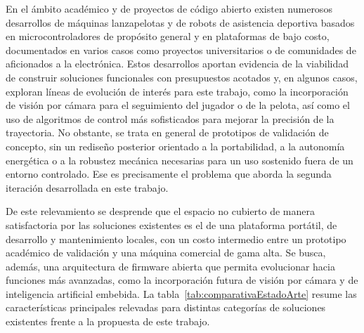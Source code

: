 En el ámbito académico y de proyectos de código abierto existen numerosos desarrollos de máquinas lanzapelotas y de robots de asistencia deportiva basados en microcontroladores de propósito general y en plataformas de bajo costo, documentados en varios casos como proyectos universitarios o de comunidades de aficionados a la electrónica. Estos desarrollos aportan evidencia de la viabilidad de construir soluciones funcionales con presupuestos acotados y, en algunos casos, exploran líneas de evolución de interés para este trabajo, como la incorporación de visión por cámara para el seguimiento del jugador o de la pelota, así como el uso de algoritmos de control más sofisticados para mejorar la precisión de la trayectoria. No obstante, se trata en general de prototipos de validación de concepto, sin un rediseño posterior orientado a la portabilidad, a la autonomía energética o a la robustez mecánica necesarias para un uso sostenido fuera de un entorno controlado. Ese es precisamente el problema que aborda la segunda iteración desarrollada en este trabajo.

De este relevamiento se desprende que el espacio no cubierto de manera satisfactoria por las soluciones existentes es el de una plataforma portátil, de desarrollo y mantenimiento locales, con un costo intermedio entre un prototipo académico de validación y una máquina comercial de gama alta. Se busca, además, una arquitectura de firmware abierta que permita evolucionar hacia funciones más avanzadas, como la incorporación futura de visión por cámara y de inteligencia artificial embebida. La tabla~\ref{tab:comparativaEstadoArte} resume las características principales relevadas para distintas categorías de soluciones existentes frente a la propuesta de este trabajo.

